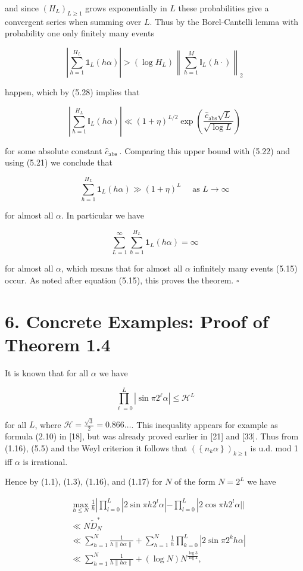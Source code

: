 \documentclass[10pt]{article}
\begin{document}
and since $\left(H_{L}\right)_{L \geqslant 1}$ grows exponentially in $L$ these probabilities give a convergent series when summing over $L$. Thus by the Borel-Cantelli lemma with probability one only finitely many events

$$
\left|\sum_{h=1}^{H_{L}} \mathbb{1}_{L}(h \alpha)\right|>\left(\log H_{L}\right)\left\|\sum_{h=1}^{M} \mathbb{I}_{L}(h \cdot)\right\|_{2}
$$

happen, which by (5.28) implies that

$$
\left|\sum_{h=1}^{H_{L}} \mathbb{I}_{L}(h \alpha)\right| \ll(1+\eta)^{L / 2} \exp \left(\frac{\hat{c}_{\mathrm{abs}} \sqrt{L}}{\sqrt{\log L}}\right)
$$

for some absolute constant $\hat{c}_{\text {abs }}$. Comparing this upper bound with (5.22) and using (5.21) we conclude that

$$
\sum_{h=1}^{H_{L}} \mathbf{1}_{L}(h \alpha) \gg(1+\eta)^{L} \quad \text { as } L \rightarrow \infty
$$

for almost all $\alpha$. In particular we have

$$
\sum_{L=1}^{\infty} \sum_{h=1}^{H_{L}} \mathbf{1}_{L}(h \alpha)=\infty
$$

for almost all $\alpha$, which means that for almost all $\alpha$ infinitely many events (5.15) occur. As noted after equation (5.15), this proves the theorem. \(\square\)

\section*{6. Concrete Examples: Proof of Theorem 1.4}
It is known that for all $\alpha$ we have


\begin{equation*}
\prod_{\ell=0}^{L}\left|\sin \pi 2^{\ell} \alpha\right| \leqslant \mathcal{H}^{L} \tag{6.1}
\end{equation*}


for all $L$, where $\mathcal{H}=\frac{\sqrt{3}}{2}=0.866 \ldots$. This inequality appears for example as formula (2.10) in [18], but was already proved earlier in [21] and [33]. Thus from (1.16), (5.5) and the Weyl criterion it follows that $\left(\left\{n_{k} \alpha\right\}\right)_{k \geqslant 1}$ is u.d. mod 1 iff $\alpha$ is irrational.

Hence by (1.1), (1.3), (1.16), and (1.17) for $N$ of the form $N=2^{L}$ we have

$$
\begin{aligned}
& \max _{h \leqslant N} \frac{1}{h}\left|\prod_{l=0}^{L}\right| 2 \sin \pi h 2^{l} \alpha\left|-\prod_{l=0}^{L}\right| 2 \cos \pi h 2^{l} \alpha| | \\
& \ll N \widetilde{D}_{N}^{*} \\
& \ll \sum_{h=1}^{N} \frac{1}{h\|h \alpha\|}+\sum_{h=1}^{N} \frac{1}{h} \prod_{k=0}^{L}\left|2 \sin \pi 2^{k} h \alpha\right| \\
& \ll \sum_{h=1}^{N} \frac{1}{h\|h \alpha\|}+(\log N) N^{\frac{\log 3}{\log 4}},
\end{aligned}
$$
\end{document}
